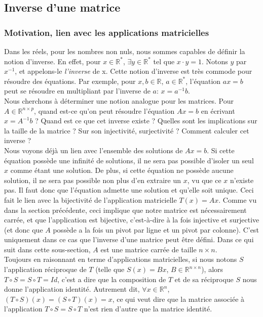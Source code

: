 \documentclass{article}
\newcommand{\R}{\mathbb{R}}
\newcommand{\cross}{\times}
\begin{document}
\subsection{Inverse d'une matrice}

\subsubsection{Motivation, lien avec les applications matricielles}
\noindent Dans les réels, pour les nombres non nuls, nous sommes capables de définir la notion d'inverse. En effet, pour $x \in \R^*$, $\exists y \in \R^*$ tel que $x\cdot y = 1$. Notons $y$ par $x^{-1}$, et appelons-le \textit{l'inverse} de x. Cette notion d'inverse est très commode pour résoudre des équations. Par exemple, pour $x,b \in \R$, $a \in \R^*$, l'équation $ax=b$ peut se résoudre en multipliant par l'inverse de $a$: $x = a^{-1} b$.\\
Nous cherchons à déterminer une notion analogue pour les matrices. Pour $A \in \R^{n \cross p}$, quand est-ce qu'on peut résoudre l'équation $Ax=b$ en écrivant $x = A^{-1}b$ ? Quand est ce que cet inverse existe ? Quelles sont les implications sur la taille de la matrice ? Sur son injectivité, surjectivité ? Comment calculer cet inverse ? \\

\noindent Nous voyons déjà un lien avec l'ensemble des solutions de $Ax=b$. Si cette équation possède une infinité de solutions, il ne sera pas possible d'isoler un seul $x$ comme étant une solution. De plus, si cette équation ne possède aucune solution, il ne sera pas possible non plus d'en extraire un $x$, vu que ce $x$ n'existe pas. Il faut donc que l'équation admette une solution et qu'elle soit unique. Ceci fait le lien avec la bijectivité de l'application matricielle $T(x) = Ax$. Comme vu dans la section précédente, ceci implique que notre matrice est nécessairement carrée, et que l'application est bijective, c'est-à-dire à la fois injective et surjective (et donc que $A$ possède a la fois un pivot par ligne et un pivot par colonne). C'est uniquement dans ce cas que l'inverse d'une matrice peut être défini. Dans ce qui suit dans cette sous-section, $A$ est une matrice carrée de taille $n \cross n$.\\

\noindent Toujours en raisonnant en terme d'applications matricielles, si nous notons $S$ l'application réciproque de $T$ (telle que $S(x) = Bx$, $B \in \R^{n \cross n}$), alors $T\circ S = S \circ T = Id$, c'est a dire que la composition de $T$ et de sa réciproque $S$ nous donne l'application identité. Autrement dit, $\forall x \in \R^n$, $(T\circ S)(x) = (S\circ T)(x) = x$, ce qui veut dire que la matrice associée à l'application $T \circ S = S \circ T$ n'est rien d'autre que la matrice identité. \\
\end{document}
